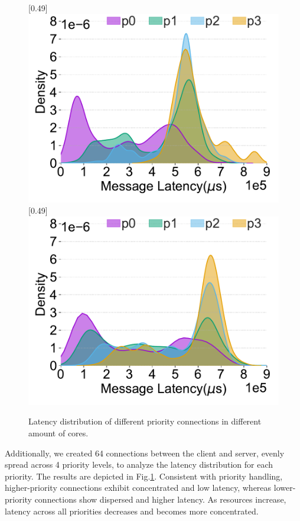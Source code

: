 \documentclass[conference]{IEEEtran}
\begin{document}
\begin{figure}[tbp]
  \centering
  [0.49\linewidth]
  {
    \includegraphics[width=\linewidth]{assets/prio-core2.pdf}
  }
  [0.49\linewidth]
  {
    \includegraphics[width=\linewidth]{assets/prio-core4.pdf}
  }
  \caption{Latency distribution of different priority connections in different amount of cores.}
  \label{fig:prio-cores}
  \vspace{-1em}
\end{figure}

Additionally, we created 64 connections between the client and server, evenly spread across 4 priority levels, to analyze the latency distribution for each priority. The results are depicted in Fig.\ref{fig:prio-cores}. Consistent with priority handling, higher-priority connections exhibit concentrated and low latency, whereas lower-priority connections show dispersed and higher latency. As resources increase, latency across all priorities decreases and becomes more concentrated.
\end{document}
